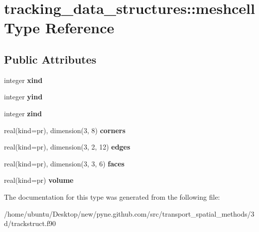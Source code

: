 \hypertarget{structtracking__data__structures_1_1meshcell}{}\section{tracking\+\_\+data\+\_\+structures\+:\+:meshcell Type Reference}
\label{structtracking__data__structures_1_1meshcell}
\subsection*{Public Attributes}
\begin{DoxyCompactItemize}
\item 
integer {\bfseries xind}\hypertarget{structtracking__data__structures_1_1meshcell_afd4a41c0924cdfa672043dff98383247}{}\label{structtracking__data__structures_1_1meshcell_afd4a41c0924cdfa672043dff98383247}

\item 
integer {\bfseries yind}\hypertarget{structtracking__data__structures_1_1meshcell_aaf221593bf60310472dfdcc78d6c2e79}{}\label{structtracking__data__structures_1_1meshcell_aaf221593bf60310472dfdcc78d6c2e79}

\item 
integer {\bfseries zind}\hypertarget{structtracking__data__structures_1_1meshcell_ae19a4af32e3f12bfa8042da05505aa6e}{}\label{structtracking__data__structures_1_1meshcell_ae19a4af32e3f12bfa8042da05505aa6e}

\item 
real(kind=pr), dimension(3, 8) {\bfseries corners}\hypertarget{structtracking__data__structures_1_1meshcell_a13fcf4021ce5a5d1579ffbff38aaf33d}{}\label{structtracking__data__structures_1_1meshcell_a13fcf4021ce5a5d1579ffbff38aaf33d}

\item 
real(kind=pr), dimension(3, 2, 12) {\bfseries edges}\hypertarget{structtracking__data__structures_1_1meshcell_a4edd8593d1bb0badbc5d723780d2c6c5}{}\label{structtracking__data__structures_1_1meshcell_a4edd8593d1bb0badbc5d723780d2c6c5}

\item 
real(kind=pr), dimension(3, 3, 6) {\bfseries faces}\hypertarget{structtracking__data__structures_1_1meshcell_a8b0a596007ab35b13961d9037d7b6e44}{}\label{structtracking__data__structures_1_1meshcell_a8b0a596007ab35b13961d9037d7b6e44}

\item 
real(kind=pr) {\bfseries volume}\hypertarget{structtracking__data__structures_1_1meshcell_a1a08090e934eae80b9b27f55c4ccaa00}{}\label{structtracking__data__structures_1_1meshcell_a1a08090e934eae80b9b27f55c4ccaa00}

\end{DoxyCompactItemize}


The documentation for this type was generated from the following file\+:\begin{DoxyCompactItemize}
\item 
/home/ubuntu/\+Desktop/new/pyne.\+github.\+com/src/transport\+\_\+spatial\+\_\+methods/3d/trackstruct.\+f90\end{DoxyCompactItemize}
